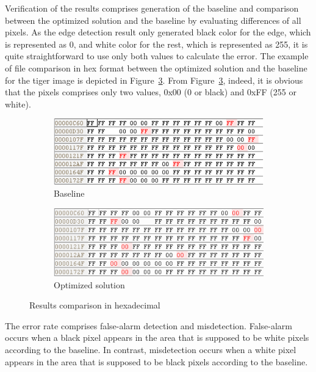 \documentclass[conference]{IEEEtran}
\begin{document}
Verification of the results comprises generation of the baseline and comparison between the optimized solution and the baseline by evaluating differences of all pixels. As the edge detection result only generated black color for the edge, which is represented as 0, and white color for the rest, which is represented as 255, it is quite straightforward to use only both values to calculate the error. The example of file comparison in hex format between the optimized solution and the baseline for the tiger image is depicted in Figure~\ref{fig:hexComparison}. From Figure~\ref{fig:hexComparison}, indeed, it is obvious that the pixels comprises only two values, 0x00 (0 or black) and 0xFF (255 or white).

\begin{figure}[!ht]
\centering
\begin{subfigure}[b]{0.24\textwidth}
    \includegraphics[width=\textwidth]{pic/baseline_hex}
    \caption{Baseline}
    \label{fig:baselineHex}
\end{subfigure}
\begin{subfigure}[b]{0.24\textwidth}
    \includegraphics[width=\textwidth]{pic/optimal_hex}
    \caption{Optimized solution}
    \label{fig:optimizedHex}
\end{subfigure}
   \caption{Results comparison in hexadecimal}
   \label{fig:hexComparison}
\end{figure} 

The error rate comprises false-alarm detection and misdetection. False-alarm occurs when a black pixel appears in the area that is supposed to be white pixels according to the baseline. In contrast, misdetection occurs when a white pixel appears in the area that is supposed to be black pixels according to the baseline.
\end{document}
